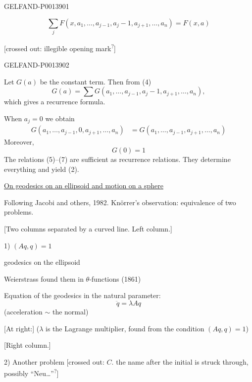 \begin{GelfandAdjacentEvidence}{GELFAND-P001390}{1}

\begin{equation*}
\sum_j F(x,a_1,\ldots,a_{j-1},a_j-1,a_{j+1},\ldots,a_n)=F(x,a)
\tag{4}
\end{equation*}

[crossed out: illegible opening mark\textsuperscript{?}]
\end{GelfandAdjacentEvidence}
\begin{GelfandAdjacentEvidence}{GELFAND-P001390}{2}

Let \(G(a)\) be the constant term. Then from (4)
\begin{equation*}
G(a)=\sum G(a_1,\ldots,a_{j-1},a_j-1,a_{j+1},\ldots,a_n),
\tag{5}
\end{equation*}
which gives a recurrence formula.

When \(a_j=0\) we obtain
\begin{equation*}
\begin{aligned}
G(a_1,\ldots,a_{j-1},0,a_{j+1},\ldots,a_n)
&=G(a_1,\ldots,a_{j-1},a_{j+1},\ldots,a_n)
\end{aligned}
\tag{6}
\end{equation*}
Moreover,
\begin{equation*}
G(0)=1
\tag{7}
\end{equation*}
The relations (5)--(7) are sufficient as recurrence relations. They determine everything and yield (2).


\uline{On geodesics on an ellipsoid and motion on a sphere}

Following Jacobi and others, 1982. Knörrer's observation: equivalence of two problems.

[Two columns separated by a curved line. Left column.]

1) \((Aq,q)=1\)

geodesics on the ellipsoid

Weierstrass found them in \(\theta\)-functions (1861)

Equation of the geodesics in the natural parameter:
\begin{equation*}
\ddot q=\lambda Aq
\tag{1}
\end{equation*}
(acceleration \(\sim\) the normal)

[At right:] (\(\lambda\) is the Lagrange multiplier, found from the condition \((Aq,q)=1\))

[Right column.]

2) Another problem [crossed out:
\(C.\) the name after the initial is struck through, possibly “Neu…”\textsuperscript{?}]
\end{GelfandAdjacentEvidence}
